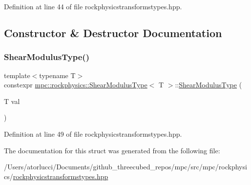 Definition at line 44 of file rockphysicstransformstypes.\+hpp.



\subsection{Constructor \& Destructor Documentation}
\mbox{\label{structmpc_1_1rockphysics_1_1_shear_modulus_type_af7e48ef066d1142209abc498bba19f29}} 
\subsubsection{\texorpdfstring{Shear\+Modulus\+Type()}{ShearModulusType()}}
{\footnotesize\ttfamily template$<$typename T$>$ \\
constexpr \mbox{\hyperlink{structmpc_1_1rockphysics_1_1_shear_modulus_type}{mpc\+::rockphysics\+::\+Shear\+Modulus\+Type}}$<$ T $>$\+::\mbox{\hyperlink{structmpc_1_1rockphysics_1_1_shear_modulus_type}{Shear\+Modulus\+Type}} (\begin{DoxyParamCaption}\item[{T}]{val }\end{DoxyParamCaption})\hspace{0.3cm}{\ttfamily [inline]}}



Definition at line 49 of file rockphysicstransformstypes.\+hpp.



The documentation for this struct was generated from the following file\+:\begin{DoxyCompactItemize}
\item 
/\+Users/atorlucci/\+Documents/github\+\_\+threecubed\+\_\+repos/mpc/src/mpc/rockphysics/\mbox{\hyperlink{rockphysicstransformstypes_8hpp}{rockphysicstransformstypes.\+hpp}}\end{DoxyCompactItemize}
